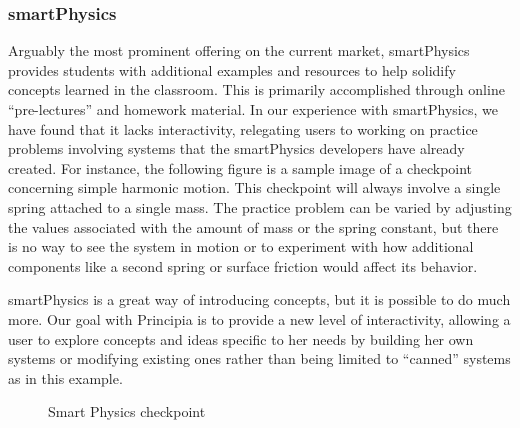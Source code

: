 \subsubsection{smartPhysics}
Arguably the most prominent offering on the current market,  smartPhysics provides students with additional examples and resources to help solidify concepts learned in the classroom. This is primarily accomplished through online ``pre-lectures'' and homework material.  In our experience with smartPhysics, we have found that it lacks interactivity, relegating users to working on practice problems involving systems that the smartPhysics developers have already created. For instance, the following figure is a sample image of a checkpoint concerning simple harmonic motion. This checkpoint will always involve a single spring attached to a single mass. The practice problem can be varied by adjusting the values associated with the amount of mass or the spring constant, but there is no way to see the system in motion or to experiment with how additional components like a second spring or surface friction would affect its behavior.

smartPhysics is a great way of introducing concepts, but it is possible to do much more. Our goal with Principia is to provide a new level of interactivity, allowing a user to explore concepts and ideas specific to her needs by building her own systems or modifying existing ones rather than being limited to ``canned'' systems as in this example.

\begin{figure}[H]
	\centering
    \caption{Smart Physics checkpoint \cite{smartPhysics}}
\end{figure}

